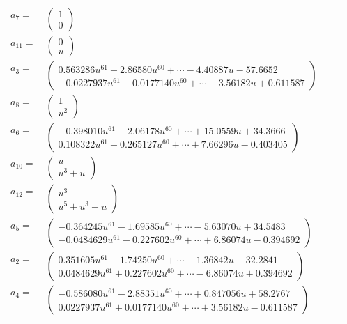 \documentclass[1p]{elsarticle_modified}
\theoremstyle{definition}
\begin{document}
\begin{tabular}{m{7pt} m{180pt} m{7pt} m{180pt} }
\flushright $a_{7}=$&$\begin{pmatrix}1\\0\end{pmatrix}$ \\
\flushright $a_{11}=$&$\begin{pmatrix}0\\u\end{pmatrix}$ \\
\flushright $a_{3}=$&$\begin{pmatrix}0.563286 u^{61}+2.86580 u^{60}+\cdots-4.40887 u-57.6652\\-0.0227937 u^{61}-0.0177140 u^{60}+\cdots-3.56182 u+0.611587\end{pmatrix}$ \\
\flushright $a_{8}=$&$\begin{pmatrix}1\\u^2\end{pmatrix}$ \\
\flushright $a_{6}=$&$\begin{pmatrix}-0.398010 u^{61}-2.06178 u^{60}+\cdots+15.0559 u+34.3666\\0.108322 u^{61}+0.265127 u^{60}+\cdots+7.66296 u-0.403405\end{pmatrix}$ \\
\flushright $a_{10}=$&$\begin{pmatrix}u\\u^3+u\end{pmatrix}$ \\
\flushright $a_{12}=$&$\begin{pmatrix}u^3\\u^5+u^3+u\end{pmatrix}$ \\
\flushright $a_{5}=$&$\begin{pmatrix}-0.364245 u^{61}-1.69585 u^{60}+\cdots-5.63070 u+34.5483\\-0.0484629 u^{61}-0.227602 u^{60}+\cdots+6.86074 u-0.394692\end{pmatrix}$ \\
\flushright $a_{2}=$&$\begin{pmatrix}0.351605 u^{61}+1.74250 u^{60}+\cdots-1.36842 u-32.2841\\0.0484629 u^{61}+0.227602 u^{60}+\cdots-6.86074 u+0.394692\end{pmatrix}$ \\
\flushright $a_{4}=$&$\begin{pmatrix}-0.586080 u^{61}-2.88351 u^{60}+\cdots+0.847056 u+58.2767\\0.0227937 u^{61}+0.0177140 u^{60}+\cdots+3.56182 u-0.611587\end{pmatrix}$ \\

\end{tabular}
\end{document}
